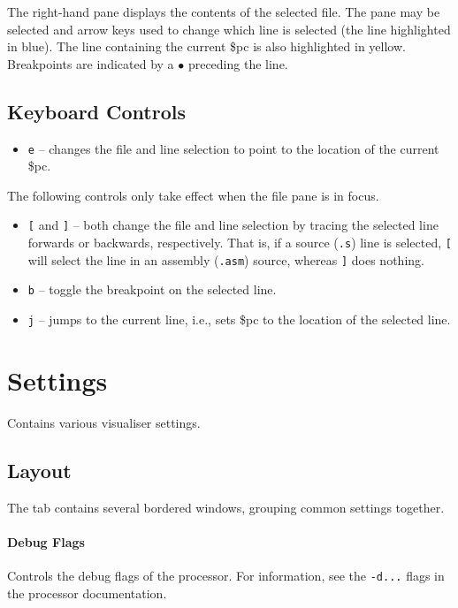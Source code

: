 \documentclass[10pt]{article}
\begin{document}
    The right-hand pane displays the contents of the selected file.
    The pane may be selected and arrow keys used to change which line is selected (the line highlighted in blue).
    The line containing the current \$pc is also highlighted in yellow.
    Breakpoints are indicated by a {\color{red}\(\bullet\)} preceding the line.

    \subsection{Keyboard Controls}

    \begin{itemize}
        \item \texttt{e} -- changes the file and line selection to point to the location of the current \$pc.
    \end{itemize}

    The following controls only take effect when the file pane is in focus.

    \begin{itemize}
        \item \texttt{[} and \texttt{]} -- both change the file and line selection by tracing the selected line forwards or backwards, respectively.
        That is, if a source (\texttt{.s}) line is selected, \texttt{[} will select the line in an assembly (\texttt{.asm}) source, whereas \texttt{]} does nothing.
        \item \texttt{b} -- toggle the breakpoint on the selected line.
        \item \texttt{j} -- jumps to the current line, i.e., sets \$pc to the location of the selected line.
    \end{itemize}

    \section{Settings}

    Contains various visualiser settings.

    \subsection{Layout}

    The tab contains several bordered windows, grouping common settings together.

    \paragraph*{Debug Flags}
    Controls the debug flags of the processor.
    For information, see the \texttt{-d...} flags in the processor documentation.
\end{document}
